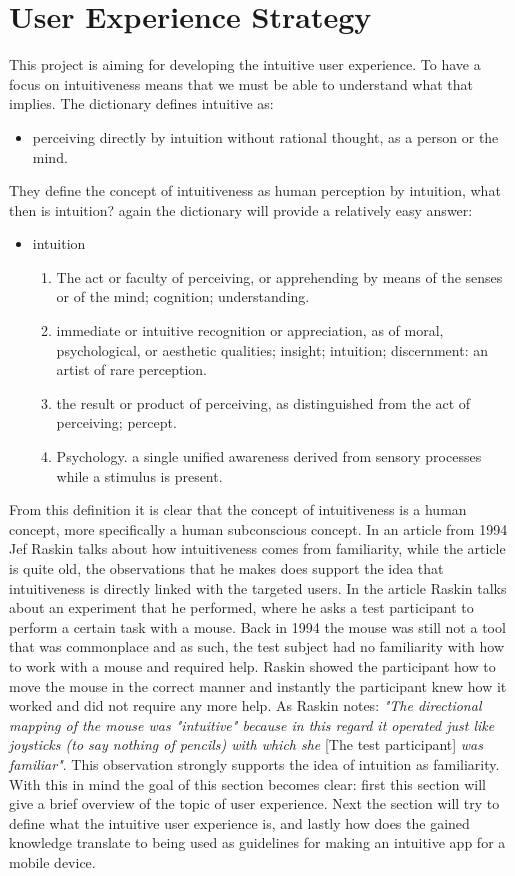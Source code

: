 \section{User Experience Strategy}
This project is aiming for developing the intuitive user experience. To have a focus on intuitiveness means that we must be able to understand what that 
implies. The dictionary defines intuitive as: 
\begin{itemize}
\item perceiving directly by intuition without rational thought, as a person or the mind.
\end{itemize}
They define the concept of intuitiveness as human perception by intuition, what 
then is intuition? again the dictionary will provide a relatively easy answer: 
\begin{itemize}
\item intuition\\
\begin{enumerate}
\item The act or faculty of perceiving, or apprehending by means of the senses or 
of the mind; cognition; understanding.
\item immediate or intuitive recognition or appreciation, as of moral, 
psychological, or aesthetic qualities; insight; intuition; discernment:
an artist of rare perception.
\item the result or product of perceiving, as distinguished from the act of 
perceiving; percept.
\item Psychology. a single unified awareness derived from sensory processes while 
a stimulus is present.
\end{enumerate}
\end{itemize} From this definition it is clear that the concept of intuitiveness is a human concept, more specifically a human subconscious concept. In an article from 1994 Jef Raskin\cite{JRaskin} talks about how intuitiveness comes from familiarity, while the article is quite old, the observations that he makes does support the idea that intuitiveness is directly linked with the targeted users. 
In the article Raskin talks about an experiment that he performed, where he asks a test participant to perform a certain task with a mouse. Back in 1994 the mouse 
was still not a tool that was commonplace and as such, the test subject had no familiarity with how to work with a mouse and required help. Raskin showed the 
participant how to move the mouse in the correct manner and instantly the participant knew how it worked and did not require any more help. As Raskin notes: \textit{"The directional mapping of the mouse was "intuitive" because in this regard it operated just like joysticks (to say nothing of pencils) with which she} [The test participant] \textit{was familiar"}.
\cite{JRaskin} This observation strongly supports the idea of intuition as familiarity. With this in mind the goal of this section becomes clear: first this section will give a brief overview of the topic of user experience. Next the section will try to define what the intuitive user experience is, and lastly how 
does the gained knowledge translate to being used as guidelines for making an intuitive app for a mobile device.  

